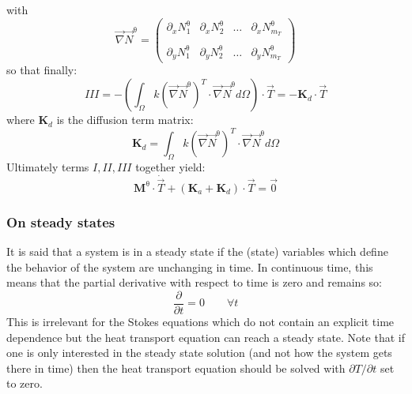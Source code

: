 with 
\[
\vec \nabla \vec N^\uptheta = 
\left(
\begin{array}{cccc}
\partial_x N_1^\uptheta & 
\partial_x N_2^\uptheta & \dots &
\partial_x N_{m_T}^\uptheta \\ \\
\partial_y N_1^\uptheta & 
\partial_y N_2^\uptheta & \dots &
\partial_y N_{m_T}^\uptheta 
\end{array}
\right)
\]
so that finally:
\[
III = - \left( \int_\Omega k (\vec \nabla \vec N^\uptheta)^T \cdot \vec \nabla \vec N^\uptheta d\Omega \right) \cdot \vec T
= - {\bm K}_d \cdot \vec T
\]
where ${\bm K}_d$ is the diffusion term matrix:
\[
{\bm K}_d = \int_\Omega  k (\vec \nabla \vec N^\uptheta)^T \cdot \vec \nabla \vec N^\uptheta d\Omega 
\]
 Ultimately terms $I,II,III$ together yield:
\[
\boxed{
{\bm M}^\uptheta \cdot \dot{\vec T} + ({\bm K}_a + {\bm K}_d) \cdot \vec T = \vec 0
}
\]



\subsubsection{On steady states}

It is said that a system is in a steady state if the (state) variables which define the behavior of the system 
are unchanging in time. In continuous time, this means that the partial derivative with respect to time is zero and remains so:
\[
\frac{\partial}{\partial t} =0 \qquad \forall t
\]
This is irrelevant for the Stokes equations which do not contain an explicit time dependence but the heat 
transport equation can reach a steady state. 
Note that if one is only interested in the steady state solution (and not how the system gets there in time)
then the heat transport equation should be solved with $\partial T/\partial t$ set to zero. 




